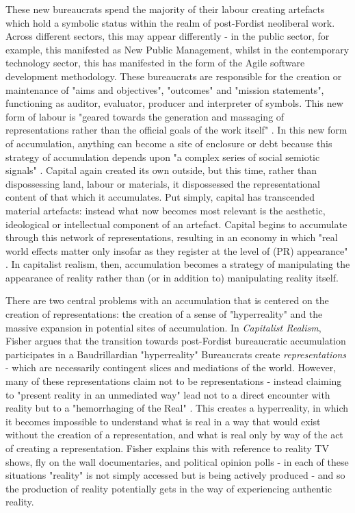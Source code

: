 These new bureaucrats spend the majority of their labour creating artefacts which hold a symbolic status within the realm of post-Fordist neoliberal work. Across different sectors, this may appear differently - in the public sector, for example, this manifested as New Public Management, whilst in the contemporary technology sector, this has manifested in the form of the Agile software development methodology. These bureaucrats are responsible for the creation or maintenance of "aims and objectives", "outcomes" and "mission statements", functioning as auditor, evaluator, producer and interpreter of symbols. This new form of labour is "geared towards the generation and massaging of representations rather than the official goals of the work itself" \citep[46]{fisher_capitalist_2009}. In this new form of accumulation, anything can become a site of enclosure or debt because this strategy of accumulation depends upon "a complex series of social semiotic signals" \citep[54]{fisher_capitalist_2009}. Capital again created its own outside, but this time, rather than dispossessing land, labour or materials, it dispossessed the representational content of that which it accumulates. Put simply, capital has transcended material artefacts: instead what now becomes most relevant is the aesthetic, ideological or intellectual component of an artefact. Capital begins to accumulate through this network of representations, resulting in an economy in which "real world effects matter only insofar as they register at the level of (PR) appearance" \citep[46]{fisher_capitalist_2009}. In capitalist realism, then, accumulation becomes a strategy of manipulating the appearance of reality rather than (or in addition to) manipulating reality itself.  

There are two central problems with an accumulation that is centered on the creation of representations: the creation of a sense of "hyperreality" and the massive expansion in potential sites of accumulation. In \emph{Capitalist Realism}, Fisher argues that the transition towards post-Fordist bureaucratic accumulation participates in a Baudrillardian "hyperreality" \citep[52]{fisher_capitalist_2009} Bureaucrats create \emph{representations} - which are necessarily contingent slices and mediations of the world. However, many of these representations claim not to be representations - instead claiming to "present reality in an unmediated way" lead not to a direct encounter with reality but to a "hemorrhaging of the Real" \citep[52]{fisher_capitalist_2009}. This creates a hyperreality, in which it becomes impossible to understand what is real in a way that would exist without the creation of a representation, and what is real only by way of the act of creating a representation. Fisher explains this with reference to reality TV shows, fly on the wall documentaries, and political opinion polls - in each of these situations "reality" is not simply accessed but is being actively produced - and so the production of  reality potentially gets in the way of experiencing authentic reality. 

